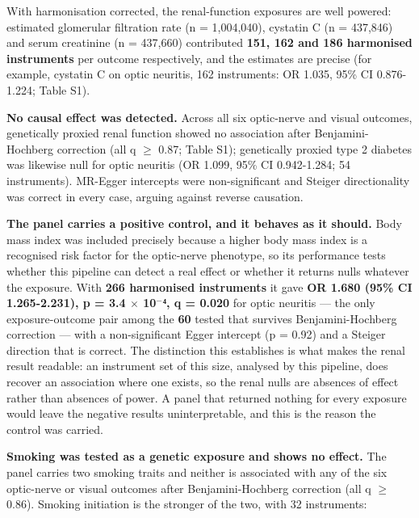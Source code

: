 \documentclass[utf8]{FrontiersinVancouver}
\begin{document}
With harmonisation corrected, the renal-function exposures are well powered: estimated glomerular filtration rate (n = 1,004,040), cystatin C (n = 437,846) and serum creatinine (n = 437,660) contributed \textbf{151, 162 and 186 harmonised instruments} per outcome respectively, and the estimates are precise (for example, cystatin C on optic neuritis, 162 instruments: OR 1.035, 95\% CI 0.876-1.224; Table S1).

\textbf{No causal effect was detected.} Across all six optic-nerve and visual outcomes, genetically proxied renal function showed no association after Benjamini-Hochberg correction (all q $\geq$ 0.87; Table S1); genetically proxied type 2 diabetes was likewise null for optic neuritis (OR 1.099, 95\% CI 0.942-1.284; 54 instruments). MR-Egger intercepts were non-significant and Steiger directionality was correct in every case, arguing against reverse causation.

\textbf{The panel carries a positive control, and it behaves as it should.} Body mass index was included precisely because a higher body mass index is a recognised risk factor for the optic-nerve phenotype, so its performance tests whether this pipeline can detect a real effect or whether it returns nulls whatever the exposure. With \textbf{266 harmonised instruments} it gave \textbf{OR 1.680 (95\% CI 1.265-2.231), p = 3.4 $\times$ 10$^{-}$⁴, q = 0.020} for optic neuritis --- the only exposure-outcome pair among the \textbf{60} tested that survives Benjamini-Hochberg correction --- with a non-significant Egger intercept (p = 0.92) and a Steiger direction that is correct. The distinction this establishes is what makes the renal result readable: an instrument set of this size, analysed by this pipeline, does recover an association where one exists, so the renal nulls are absences of effect rather than absences of power. A panel that returned nothing for every exposure would leave the negative results uninterpretable, and this is the reason the control was carried.

\textbf{Smoking was tested as a genetic exposure and shows no effect.} The panel carries two smoking traits and neither is associated with any of the six optic-nerve or visual outcomes after Benjamini-Hochberg correction (all q $\geq$ 0.86). Smoking initiation is the stronger of the two, with 32 instruments:
\end{document}
